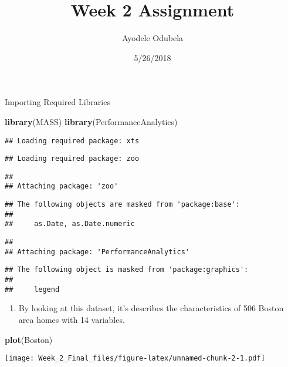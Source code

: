 \documentclass[]{article}
\title{Week 2 Assignment}
\author{Ayodele Odubela}
\date{5/26/2018}
\newenvironment{Shaded}{\begin{snugshade}}{\end{snugshade}}
\newcommand{\KeywordTok}[1]{\textcolor[rgb]{0.13,0.29,0.53}{\textbf{#1}}}
\newcommand{\NormalTok}[1]{#1}
\providecommand{\tightlist}{%
  \setlength{\itemsep}{0pt}\setlength{\parskip}{0pt}}
\begin{document}
\maketitle

Importing Required Libraries

\begin{Shaded}
\begin{Highlighting}[]
\KeywordTok{library}\NormalTok{(MASS)}
\KeywordTok{library}\NormalTok{(PerformanceAnalytics)}
\end{Highlighting}
\end{Shaded}

\begin{verbatim}
## Loading required package: xts
\end{verbatim}

\begin{verbatim}
## Loading required package: zoo
\end{verbatim}

\begin{verbatim}
## 
## Attaching package: 'zoo'
\end{verbatim}

\begin{verbatim}
## The following objects are masked from 'package:base':
## 
##     as.Date, as.Date.numeric
\end{verbatim}

\begin{verbatim}
## 
## Attaching package: 'PerformanceAnalytics'
\end{verbatim}

\begin{verbatim}
## The following object is masked from 'package:graphics':
## 
##     legend
\end{verbatim}

\begin{enumerate}
\def\labelenumi{\arabic{enumi})}
\tightlist
\item
  By looking at this dataset, it's describes the characteristics of 506
  Boston area homes with 14 variables.
\end{enumerate}

\begin{Shaded}
\begin{Highlighting}[]
\KeywordTok{plot}\NormalTok{(Boston)}
\end{Highlighting}
\end{Shaded}

\texttt{[image: Week\_2\_Final\_files/figure-latex/unnamed-chunk-2-1.pdf]}
\end{document}
